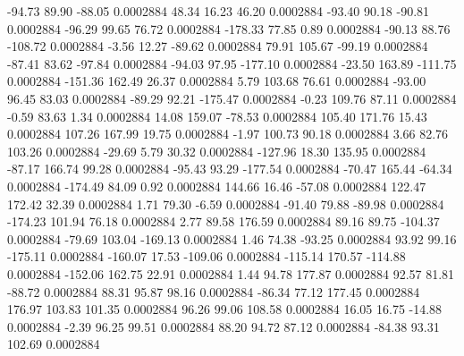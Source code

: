       -94.73       89.90      -88.05     0.0002884
       48.34       16.23       46.20     0.0002884
      -93.40       90.18      -90.81     0.0002884
      -96.29       99.65       76.72     0.0002884
     -178.33       77.85        0.89     0.0002884
      -90.13       88.76     -108.72     0.0002884
       -3.56       12.27      -89.62     0.0002884
       79.91      105.67      -99.19     0.0002884
      -87.41       83.62      -97.84     0.0002884
      -94.03       97.95     -177.10     0.0002884
      -23.50      163.89     -111.75     0.0002884
     -151.36      162.49       26.37     0.0002884
        5.79      103.68       76.61     0.0002884
      -93.00       96.45       83.03     0.0002884
      -89.29       92.21     -175.47     0.0002884
       -0.23      109.76       87.11     0.0002884
       -0.59       83.63        1.34     0.0002884
       14.08      159.07      -78.53     0.0002884
      105.40      171.76       15.43     0.0002884
      107.26      167.99       19.75     0.0002884
       -1.97      100.73       90.18     0.0002884
        3.66       82.76      103.26     0.0002884
      -29.69        5.79       30.32     0.0002884
     -127.96       18.30      135.95     0.0002884
      -87.17      166.74       99.28     0.0002884
      -95.43       93.29     -177.54     0.0002884
      -70.47      165.44      -64.34     0.0002884
     -174.49       84.09        0.92     0.0002884
      144.66       16.46      -57.08     0.0002884
      122.47      172.42       32.39     0.0002884
        1.71       79.30       -6.59     0.0002884
      -91.40       79.88      -89.98     0.0002884
     -174.23      101.94       76.18     0.0002884
        2.77       89.58      176.59     0.0002884
       89.16       89.75     -104.37     0.0002884
      -79.69      103.04     -169.13     0.0002884
        1.46       74.38      -93.25     0.0002884
       93.92       99.16     -175.11     0.0002884
     -160.07       17.53     -109.06     0.0002884
     -115.14      170.57     -114.88     0.0002884
     -152.06      162.75       22.91     0.0002884
        1.44       94.78      177.87     0.0002884
       92.57       81.81      -88.72     0.0002884
       88.31       95.87       98.16     0.0002884
      -86.34       77.12      177.45     0.0002884
      176.97      103.83      101.35     0.0002884
       96.26       99.06      108.58     0.0002884
       16.05       16.75      -14.88     0.0002884
       -2.39       96.25       99.51     0.0002884
       88.20       94.72       87.12     0.0002884
      -84.38       93.31      102.69     0.0002884

